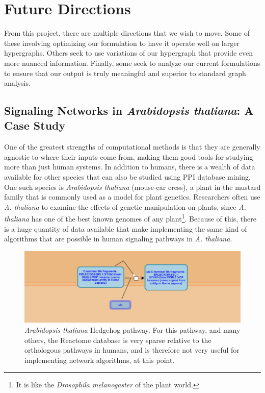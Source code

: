 \documentclass[12pt,twoside]{reedthesis}
\theoremstyle{definition}
\begin{document}
  \section{Future Directions}

  From this project, there are multiple directions that we wish to move. Some of these involving optimizing our formulation to have it operate well on larger hypergraphs. Others seek to use variations of our hypergraph that provide even more nuanced information. Finally, some seek to analyze our current formulations to ensure that our output is truly meaningful and superior to standard graph analysis.

   \subsection{Signaling Networks in \emph{Arabidopsis thaliana}: A Case Study}

   One of the greatest strengths of computational methods is that they are generally agnostic to where their inputs come from, making them good tools for studying more than just human systems. In addition to humans, there is a wealth of data available for other species that can also be studied using PPI database mining. One such species is \textit{Arabidopsis thaliana} (mouse-ear cress), a plant in the mustard family that is commonly used as a model for plant genetics. Researchers often use \textit{A. thaliana} to examine the effects of genetic manipulation on plants, since \textit{A. thaliana} has one of the best known genomes of any plant\footnote{It is like the \textit{Drosophila melanogaster} of the plant world.}. Because of this, there is a huge quantity of data available that make implementing the same kind of algorithms that are possible in human signaling pathways in \textit{A. thaliana}.

   \begin{figure}[h]
     \begin{center}
       \includegraphics[width=\textwidth]{at_hh}
     \caption[\textit{Arabidopsis thaliana} Hedgehog pathway.]{\textit{Arabidopsis thaliana} Hedgehog pathway. For this pathway, and many others, the Reactome database is very sparse relative to the orthologous pathways in humans, and is therefore not very useful for implementing network algorithms, at this point.}
     \label{fig:at_hh}
     \end{center}
   \end{figure}
\end{document}
